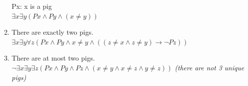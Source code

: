\documentclass{article}
\begin{document}
\begin{enumerate}
            Px: x is a pig\\
            $\exists x \exists y (Px \land Py \land (x \neq y))$
      \item There are exactly two pigs.\\
            $\exists x \exists y \forall z (Px \land Py \land x \neq y \land ((z \neq x \land z \neq y) \to \neg Pz))$
      \item There are at most two pigs.\\ 
            $\neg \exists x \exists y \exists z (Px \land Py \land Pz \land (x \neq y \land x \neq z \land y \neq z))$
            \textit{(there are not 3 unique pigs)}
      
\end{enumerate}
\end{document}
